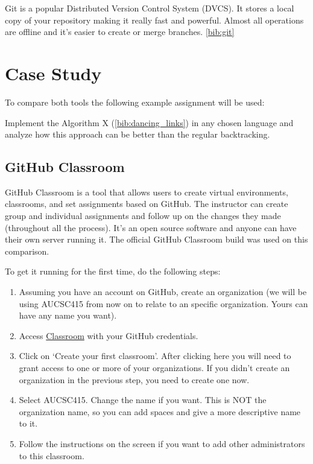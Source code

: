 \documentclass[12pt]{article}
\begin{document}
Git is a popular Distributed Version Control System (DVCS). It stores a local copy of your repository making it really fast and powerful. Almost all operations are offline and it's easier to create or merge branches. \ref{bib:git}


\section{Case Study}

To compare both tools the following example assignment will be used: 

Implement the Algorithm X (\ref{bib:dancing_links}) in any chosen language and analyze how this approach can be better than the regular backtracking.

\subsection{GitHub Classroom}

GitHub Classroom is a tool that allows users to create virtual environments, classrooms, and set assignments based on GitHub. The instructor can create group and individual assignments and follow up on the changes they made (throughout all the process). It's an open source software and anyone can have their own server running it. The official GitHub Classroom build was used on this comparison.

To get it running for the first time, do the following steps:

\begin{enumerate}

\item Assuming you have an account on GitHub, create an organization (we will be using AUCSC415 from now on to relate to an specific organization. Yours can have any name you want).

\item Access \href{https://classroom.github.com}{Classroom} with your GitHub credentials. 

\item Click on `Create your first classroom'. After clicking here you will need to grant access to one or more of your organizations. If you didn't create an organization in the previous step, you need to create one now.

\item Select AUCSC415. Change the name if you want. This is NOT the organization name, so you can add spaces and give a more descriptive name to it.

\item Follow the instructions on the screen if you want to add other administrators to this classroom.

\end{enumerate}
\end{document}
